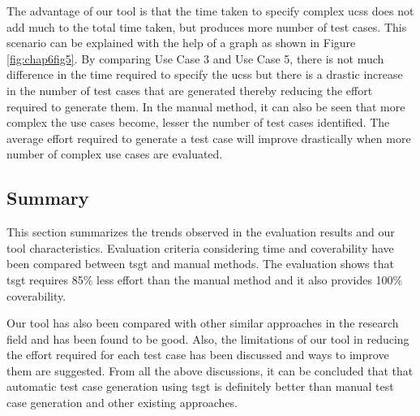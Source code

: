 The advantage of our tool is that the time taken to specify complex \glspl{ucs} does not add much to the total time taken, but produces more number of test cases. This scenario can be explained with the help of a graph as shown in Figure \ref{fig:chap6fig5}. By comparing Use Case 3 and Use Case 5, there is not much difference in the time required to specify the \glspl{ucs} but there is a drastic increase in the number of test cases that are generated thereby reducing the effort required to generate them. In the manual method, it can also be seen that more complex the use cases become, lesser the number of test cases identified. The average effort required to generate a test case will improve drastically when more number of complex use cases are evaluated.

\subsection{Summary}
This section summarizes the trends observed in the evaluation results and our tool characteristics. Evaluation criteria considering time and coverability have been compared between \gls{tsgt} and manual methods. The evaluation shows that \gls{tsgt} requires 85\% less effort than the manual method and it also provides 100\% coverability. 

Our tool has also been compared with other similar approaches in the research field and has been found to be good. Also, the limitations of our tool in reducing the effort required for each test case has been discussed and ways to improve them are suggested. From all the above discussions, it can be concluded that that automatic test case generation using \gls{tsgt} is definitely better than manual test case generation and other existing approaches. 